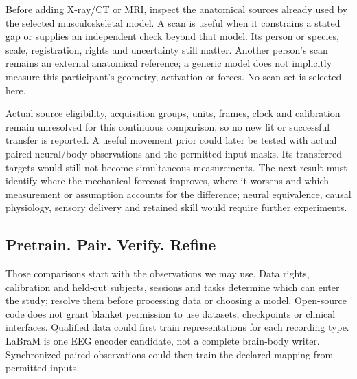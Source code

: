 Before adding X-ray/CT or MRI, inspect the anatomical sources already used by the selected musculoskeletal model. A scan is useful when it constrains a stated gap or supplies an independent check beyond that model. Its person or species, scale, registration, rights and uncertainty still matter. Another person's scan remains an external anatomical reference; a generic model does not implicitly measure this participant's geometry, activation or forces. No scan set is selected here.

Actual source eligibility, acquisition groups, units, frames, clock and calibration remain unresolved for this continuous comparison, so no new fit or successful transfer is reported. A useful movement prior could later be tested with actual paired neural/body observations and the permitted input masks. Its transferred targets would still not become simultaneous measurements. The next result must identify where the mechanical forecast improves, where it worsens and which measurement or assumption accounts for the difference; neural equivalence, causal physiology, sensory delivery and retained skill would require further experiments.

\subsection{Pretrain. Pair. Verify. Refine}
Those comparisons start with the observations we may use. Data rights,
calibration and held-out subjects, sessions and tasks determine which can
enter the study; resolve them before processing data or choosing a model.
Open-source code does not grant blanket permission to use datasets,
checkpoints or clinical interfaces. Qualified data could first train
representations for each recording type. LaBraM is one EEG encoder candidate,
not a complete brain-body writer. Synchronized paired observations could
then train the declared mapping from permitted inputs.

